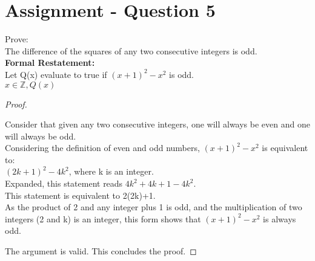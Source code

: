 \documentclass{article}
\begin{document}
\section*{Assignment - Question 5}
Prove:\\
The difference of the squares of any two consecutive integers is odd.\\
\textbf{Formal Restatement:}\\
Let Q(x) evaluate to true if $(x+1)^2 - x^2$ is odd.\\
$x \in \mathbb{Z}, Q(x)$\\
\begin{proof}
  \begin{addmargin}{1em}
    Consider that given any two consecutive integers, one will always be even and one will always be odd.\\
    Considering the definition of even and odd numbers, $(x+1)^2 - x^2$ is equivalent to:\\
    \indent $(2k+1)^2 - 4k^2$, where k is an integer.\\
    Expanded, this statement reads $4k^2+4k+1-4k^2$.\\
    This statement is equivalent to 2(2k)+1.\\
    As the product of 2 and any integer plus 1 is odd, and the multiplication of two integers (2 and k) is an integer, this form shows that $(x+1)^2-x^2$ is always odd.\\
  \end{addmargin}
  The argument is valid. This concludes the proof.
\end{proof}
\end{document}
